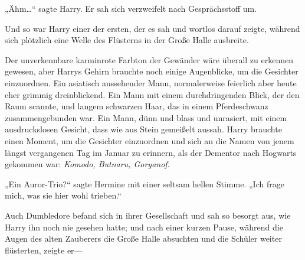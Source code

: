 „Ähm…“ sagte Harry. Er sah sich verzweifelt nach Gesprächsstoff um.

Und so war Harry einer der ersten, der es sah und wortlos darauf zeigte, während sich plötzlich eine Welle des Flüsterns in der Große Halle ausbreite.

Der unverkennbare karminrote Farbton der Gewänder wäre überall zu erkennen gewesen, aber Harrys Gehirn brauchte noch einige Augenblicke, um die Gesichter einzuordnen. Ein asiatisch aussehender Mann, normalerweise feierlich aber heute eher grimmig dreinblickend. Ein Mann mit einem durchdringenden Blick, der den Raum scannte, und langem schwarzen Haar, das in einem Pferdeschwanz zusammengebunden war. Ein Mann, dünn und blass und unrasiert, mit einem ausdruckslosen Gesicht, dass wie aus Stein gemeißelt aussah. Harry brauchte einen Moment, um die Gesichter einzuordnen und sich an die Namen von jenem längst vergangenen Tag im Januar zu erinnern, als der Dementor nach Hogwarts gekommen war: \emph{Komodo, Butnaru, Goryanof}.

„Ein Auror-Trio?“ sagte Hermine mit einer seltsam hellen Stimme. „Ich frage mich, was sie hier wohl trieben.“

Auch Dumbledore befand sich in ihrer Gesellschaft und sah so besorgt aus, wie Harry ihn noch nie gesehen hatte; und nach einer kurzen Pause, während die Augen des alten Zauberers die Große Halle absuchten und die Schüler weiter flüsterten, zeigte er—

